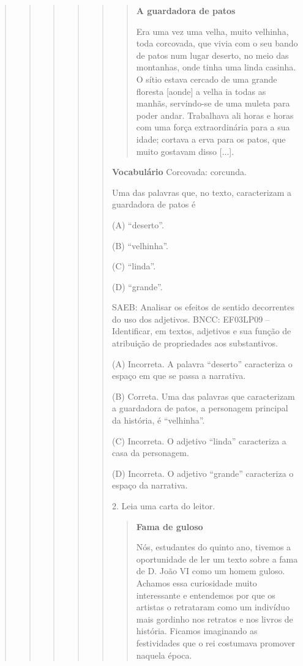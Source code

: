\begin{boxlist}
{{\begin{quote}
\begin{quote}
\begin{quote}
{\begin{quote}
{\begin{quote}
\begin{quote}
\textbf{A guardadora de patos}

Era uma vez uma velha, muito velhinha, toda corcovada, que vivia com o
seu bando de patos num lugar deserto, no meio das montanhas, onde tinha
uma linda casinha. O sítio estava cercado de uma grande floresta [aonde] a
velha ia todas as manhãs, servindo-se de uma muleta para poder andar.
Trabalhava ali horas e horas com uma força extraordinária para a sua
idade; cortava a erva para os patos, que muito gostavam disso
{[}...{]}.

\end{quote}

\textbf{Vocabulário}
Corcovada: corcunda.

Uma das palavras que, no texto, caracterizam a guardadora de
patos é

(A) ``deserto''.

(B) ``velhinha''.

(C) ``linda''.

(D) ``grande''.

SAEB: Analisar os efeitos de sentido decorrentes do uso dos adjetivos.
BNCC: EF03LP09 -- Identificar, em textos, adjetivos e sua função de
atribuição de propriedades aos substantivos.

(A) Incorreta. A palavra ``deserto'' caracteriza o espaço em que se
passa a narrativa.

(B) Correta. Uma das palavras que caracterizam a
guardadora de patos, a personagem principal da história, é ``velhinha''.

(C) Incorreta. O adjetivo ``linda'' caracteriza a casa da personagem.

(D) Incorreta. O adjetivo ``grande'' caracteriza o espaço da narrativa.

2. Leia uma carta do leitor.

\begin{quote}
\textbf{Fama de guloso}

Nós, estudantes do quinto ano, tivemos a oportunidade de ler um texto sobre a fama de D. João VI como um homem guloso. Achamos essa curiosidade muito interessante e entendemos por que os artistas o retrataram como um indivíduo mais gordinho nos retratos e nos livros de história. Ficamos imaginando as festividades que o rei costumava promover naquela época.


\end{quote}
\end{quote}}
\end{quote}}
\end{quote}
\end{quote}
\end{quote}}}
\end{boxlist}
